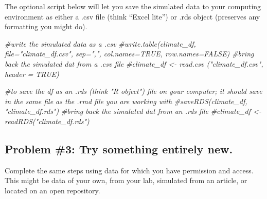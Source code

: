 \documentclass[
  english,
]{book}
\newenvironment{Shaded}{\begin{snugshade}}{\end{snugshade}}
\newcommand{\CommentTok}[1]{\textcolor[rgb]{0.56,0.35,0.01}{\textit{#1}}}
\begin{document}
The optional script below will let you save the simulated data to your computing environment as either a .csv file (think ``Excel lite'') or .rds object (preserves any formatting you might do).

\begin{Shaded}
\begin{Highlighting}[]
\CommentTok{#write the simulated data  as a .csv}
\CommentTok{#write.table(climate_df, file="climate_df.csv", sep=",", col.names=TRUE, row.names=FALSE)}
\CommentTok{#bring back the simulated dat from a .csv file}
\CommentTok{#climate_df <- read.csv ("climate_df.csv", header = TRUE)}
\end{Highlighting}
\end{Shaded}

\begin{Shaded}
\begin{Highlighting}[]
\CommentTok{#to save the df as an .rds (think "R object") file on your computer; it should save in the same file as the .rmd file you are working with}
\CommentTok{#saveRDS(climate_df, "climate_df.rds")}
\CommentTok{#bring back the simulated dat from an .rds file}
\CommentTok{#climate_df <- readRDS("climate_df.rds")}
\end{Highlighting}
\end{Shaded}

\hypertarget{problem-3-try-something-entirely-new.-1}{%
\subsection{Problem \#3: Try something entirely new.}\label{problem-3-try-something-entirely-new.-1}}

Complete the same steps using data for which you have permission and access. This might be data of your own, from your lab, simulated from an article, or located on an open repository.
\end{document}
